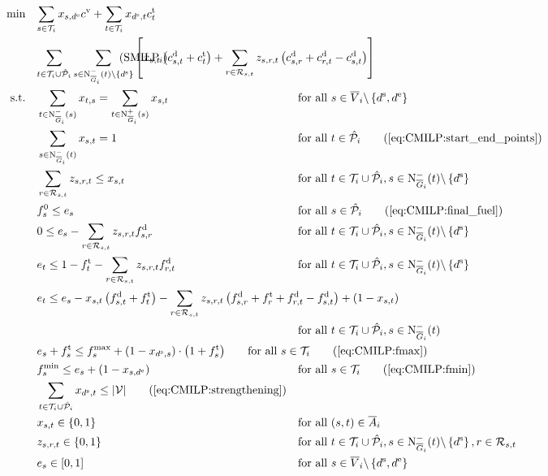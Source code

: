 \begin{align}
	\min \quad & \omit\rlap{$\displaystyle{\sum_{s\in\Ti} x_{s,\de}\cv + \sum_{t\in\Ti} x_{\ds, t}\ct_t}$} \nonumber \\
	& \omit\rlap{$\displaystyle{\sum_{t\in\Ti\cup\Phat_i}\sum_{s\in\Ninoi(t)\backslash\left\{\ds\right\}}\left[x_{s,t}\left(\cd_{s,t}+\ct_t\right)+\sum_{r\in\Rst}z_{s,r,t}\left(\cd_{s,r}+\cd_{r,t}-\cd_{s,t}\right)\right]}$} \tag{$\operatorname{SMILP}_i$} \label{eq:SMILPi} \\
	\text{s.t.} \quad & \sum_{t\in\Ninoi(s)} x_{t,s} = \sum_{t\in\Noutoi(s)} x_{s,t} & & \text{for all } s\in \overline{V}_i\backslash\left\{\ds,\de\right\} \label{eq:CMILP:flow} \\
	& \sum_{s\in\Ninoi(t)} x_{s,t} = 1 && \text{for all } t\in\Phat_i \tag{\ref{eq:CMILP:start_end_points}} \\	
	& \sum_{r\in\Rst} z_{s,r,t} \leq x_{s,t} && \text{for all } t\in\Ti\cup\Phat_i, s\in\Ninoi(t)\backslash\left\{\ds\right\} \label{eq:CMILP:refuel} \\
	& f^0_s \leq e_s && \text{for all } s\in\Phat_i \tag{\ref{eq:CMILP:final_fuel}} \\
	& 0 \leq e_s - \sum_{r\in\Rst} z_{s,r,t}\fd_{s,r} & & \text{for all } t\in\Ti\cup\Phat_i, s\in\Ninoi(t)\backslash\left\{\ds\right\} \label{eq:CMILP:min_fuel} \\
	& e_t \leq 1 - \ft_t - \sum_{r\in\Rst} z_{s,r,t}\fd_{r,t} & & \text{for all } t\in\Ti\cup\Phat_i, s\in\Ninoi(t)\backslash\left\{\ds\right\} \label{eq:CMILP:max_fuel} \\
	& \omit\rlap{$\displaystyle{e_t \leq e_s - x_{s,t}\left(f_{s,t}^{\operatorname{d}}+f_t^{\operatorname{t}}\right) - \sum_{r\in\Rst} z_{s,r,t}\left(\fd_{s,r}+\ft_r+\fd_{r,t}-\fd_{s,t}\right) + \left(1-x_{s,t}\right)}$} \nonumber \\
	& & & \text{for all } t\in\Ti\cup\Phat_i, s\in\Ninoi(t) \label{eq:CMILP:fuel_consumption} \\
	& \omit\rlap{$\displaystyle{e_s + \ft_s \leq f^{\max}_s + \left(1-x_{\ds,s}\right)\cdot\left(1+\ft_s\right)} \qquad \text{for all } s\in\Ti \tag{\ref{eq:CMILP:fmax}}$} \\
	& f^{\min}_s \leq e_s + \left(1-x_{s,\de}\right) && \text{for all } s\in\Ti \tag{\ref{eq:CMILP:fmin}} \\
	& \sum_{t\in\Ti\cup\Phat_i} x_{\ds,t} \leq \vert\mathcal{V}\vert \tag{\ref{eq:CMILP:strengthening}} \\
	& x_{s,t}\in\{0,1\} & & \text{for all } (s,t)\in\overline{A}_i \label{eq:CMILP:xst} \\
	& z_{s,r,t}\in\{0,1\} & & \text{for all } t\in\Ti\cup\Phat_i,s\in\Ninoi(t)\backslash\left\{\ds\right\},r\in\Rst \label{eq:CMILP:zsrt} \\
	& e_s\in[0,1] & & \text{for all } s\in\overline{V}_i\backslash\left\{\ds,\de\right\} \label{eq:CMILP:es}
\end{align}

